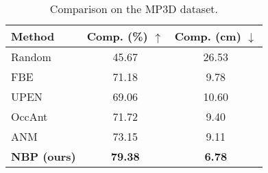 \begin{wraptable}{l}{0.5\textwidth} %
\centering
\vspace{-0.5em}
\caption{Comparison on the MP3D dataset.}
\label{tab:comparison3}
\begin{tabular}{lcc}
\toprule 
\textbf{Method} & \textbf{Comp. (\%) $\uparrow$} & \textbf{Comp. (cm) $\downarrow$} \\
\midrule
Random & 45.67 & 26.53 \\
FBE & 71.18 & 9.78 \\
UPEN & 69.06 & 10.60 \\
OccAnt & 71.72 & 9.40 \\
ANM &  73.15 & 9.11 \\
\textbf{NBP (ours)} & \textbf{79.38} & \textbf{6.78} \\
\bottomrule
\end{tabular}%
\vspace{-0.5em}
\end{wraptable}